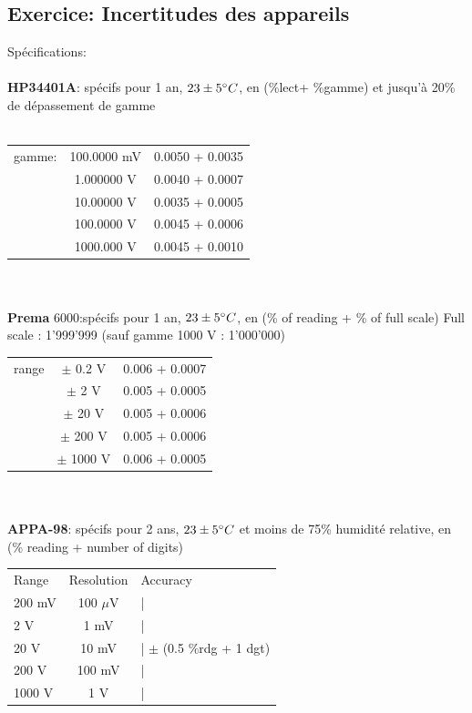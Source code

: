 \subsection{Exercice: Incertitudes des appareils }
Spécifications:\\
\\
\textbf{HP34401A}: spécifs pour 1 an, $23 \pm 5 \degree C$, en (\%lect+ \%gamme) et jusqu'à 20\% de dépassement de gamme\\
\\
\begin{tabular}{l c c}
\hline
gamme: 	& 100.0000 mV	& 0.0050 + 0.0035 \\
		& 1.000000 V	& 0.0040 + 0.0007 \\
    	& 10.00000 V	& 0.0035 + 0.0005 \\
		& 100.0000 V	& 0.0045 + 0.0006 \\
		& 1000.000 V	& 0.0045 + 0.0010 \\
\hline
\end{tabular}
\\
\\
\textbf{Prema} 6000:spécifs pour 1 an, $23 \pm 5 \degree C$, en (\% of reading + \% of full scale)
	Full scale : 1'999'999 (sauf gamme 1000 V : 1'000'000)
\\
\begin{tabular}{lcc}
\hline
range & $\pm$ 0.2 V & 0.006 + 0.0007 \\
	& $\pm$ 2 V	& 0.005 + 0.0005 \\
	& $\pm$ 20 V	& 0.005 + 0.0006 \\
	& $\pm$ 200 V	& 0.005 + 0.0006 \\
	& $\pm$ 1000 V	& 0.006 + 0.0005 \\
\hline
\end{tabular}
\\
\\
\textbf{APPA-98}: spécifs pour 2 ans, $23 \pm 5 \degree C$ et moins de 75\% humidité relative, en (\% reading + number of digits)
\\
\begin{tabular}{lcl}
\hline
	Range	& Resolution	& Accuracy \\
	200 mV	& 100 $\mu$V	& | \\
	2 V	& 1 mV	& | \\
	20 V	& 10 mV	& |  $\pm$ (0.5 \%rdg + 1 dgt) \\
	200 V	& 100 mV	& | \\
	1000 V	& 1 V	& | \\
\hline
\end{tabular}
\\

